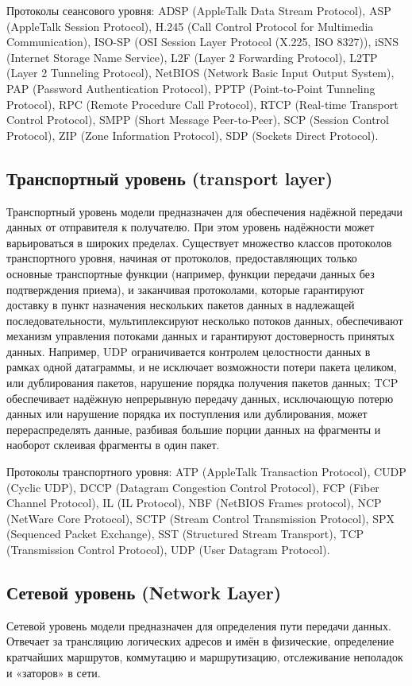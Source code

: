 \documentclass[a4paper,12pt]{article}
\begin{document}
		Протоколы сеансового уровня: ADSP (AppleTalk Data Stream Protocol), ASP (AppleTalk Session Protocol), H.245 (Call Control Protocol for Multimedia Communication), ISO-SP (OSI Session Layer Protocol (X.225, ISO 8327)), iSNS (Internet Storage Name Service), L2F (Layer 2 Forwarding Protocol), L2TP (Layer 2 Tunneling Protocol), NetBIOS (Network Basic Input Output System), PAP (Password Authentication Protocol), PPTP (Point-to-Point Tunneling Protocol), RPC (Remote Procedure Call Protocol), RTCP (Real-time Transport Control Protocol), SMPP (Short Message Peer-to-Peer), SCP (Session Control Protocol), ZIP (Zone Information Protocol), SDP (Sockets Direct Protocol).
	
		\subsection{Транспортный уровень (transport layer)}
		Транспортный уровень модели предназначен для обеспечения надёжной передачи данных от отправителя к получателю. При этом уровень надёжности может варьироваться в широких пределах. Существует множество классов протоколов транспортного уровня, начиная от протоколов, предоставляющих только основные транспортные функции (например, функции передачи данных без подтверждения приема), и заканчивая протоколами, которые гарантируют доставку в пункт назначения нескольких пакетов данных в надлежащей последовательности, мультиплексируют несколько потоков данных, обеспечивают механизм управления потоками данных и гарантируют достоверность принятых данных. Например, UDP ограничивается контролем целостности данных в рамках одной датаграммы, и не исключает возможности потери пакета целиком, или дублирования пакетов, нарушение порядка получения пакетов данных; TCP обеспечивает надёжную непрерывную передачу данных, исключающую потерю данных или нарушение порядка их поступления или дублирования, может перераспределять данные, разбивая большие порции данных на фрагменты и наоборот склеивая фрагменты в один пакет.
		
		Протоколы транспортного уровня: ATP (AppleTalk Transaction Protocol), CUDP (Cyclic UDP), DCCP (Datagram Congestion Control Protocol), FCP (Fiber Channel Protocol), IL (IL Protocol), NBF (NetBIOS Frames protocol), NCP (NetWare Core Protocol), SCTP (Stream Control Transmission Protocol), SPX (Sequenced Packet Exchange), SST (Structured Stream Transport), TCP (Transmission Control Protocol), UDP (User Datagram Protocol).
		\subsection{Сетевой уровень (Network Layer)}
		Сетевой уровень модели предназначен для определения пути передачи данных. Отвечает за трансляцию логических адресов и имён в физические, определение кратчайших маршрутов, коммутацию и маршрутизацию, отслеживание неполадок и «заторов» в сети.
		
\end{document}
